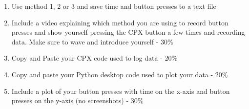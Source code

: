 \begin{enumerate}[itemsep=-5pt]
\item Use method 1, 2 or 3 and save time and button presses to a text file
\item Include a video explaining which method you are using to record button presses and show yourself pressing the CPX button a few times and recording data. Make sure to wave and introduce yourself - 30\%
\item Copy and Paste your CPX code used to log data - 20\%
\item Copy and paste your Python desktop code used to plot your data - 20\%
\item Include a plot of your button presses with time on the x-axis and button presses on the y-axis (no screenshots) - 30\%
\end{enumerate}
